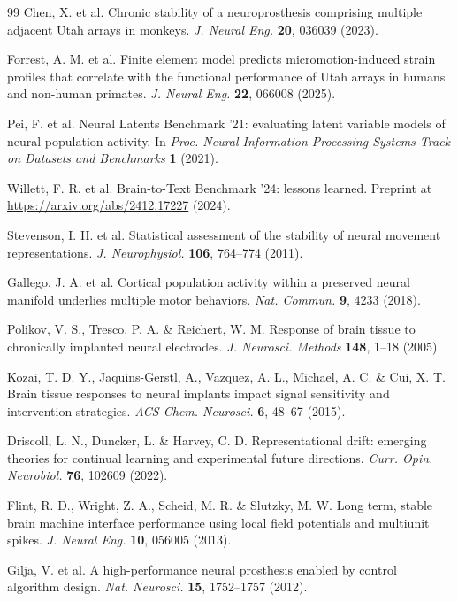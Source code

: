 \begin{thebibliography}{99}
 Chen, X. et al. Chronic stability of a neuroprosthesis comprising multiple adjacent Utah arrays in monkeys. \textit{J. Neural Eng.} \textbf{20}, 036039 (2023).

 Forrest, A. M. et al. Finite element model predicts micromotion-induced strain profiles that correlate with the functional performance of Utah arrays in humans and non-human primates. \textit{J. Neural Eng.} \textbf{22}, 066008 (2025).

 Pei, F. et al. Neural Latents Benchmark '21: evaluating latent variable models of neural population activity. In \textit{Proc. Neural Information Processing Systems Track on Datasets and Benchmarks} \textbf{1} (2021).

 Willett, F. R. et al. Brain-to-Text Benchmark '24: lessons learned. Preprint at \url{https://arxiv.org/abs/2412.17227} (2024).

 Stevenson, I. H. et al. Statistical assessment of the stability of neural movement representations. \textit{J. Neurophysiol.} \textbf{106}, 764--774 (2011).

 Gallego, J. A. et al. Cortical population activity within a preserved neural manifold underlies multiple motor behaviors. \textit{Nat. Commun.} \textbf{9}, 4233 (2018).

 Polikov, V. S., Tresco, P. A. \& Reichert, W. M. Response of brain tissue to chronically implanted neural electrodes. \textit{J. Neurosci. Methods} \textbf{148}, 1--18 (2005).

 Kozai, T. D. Y., Jaquins-Gerstl, A., Vazquez, A. L., Michael, A. C. \& Cui, X. T. Brain tissue responses to neural implants impact signal sensitivity and intervention strategies. \textit{ACS Chem. Neurosci.} \textbf{6}, 48--67 (2015).

 Driscoll, L. N., Duncker, L. \& Harvey, C. D. Representational drift: emerging theories for continual learning and experimental future directions. \textit{Curr. Opin. Neurobiol.} \textbf{76}, 102609 (2022).

 Flint, R. D., Wright, Z. A., Scheid, M. R. \& Slutzky, M. W. Long term, stable brain machine interface performance using local field potentials and multiunit spikes. \textit{J. Neural Eng.} \textbf{10}, 056005 (2013).

 Gilja, V. et al. A high-performance neural prosthesis enabled by control algorithm design. \textit{Nat. Neurosci.} \textbf{15}, 1752--1757 (2012).


\end{thebibliography}
